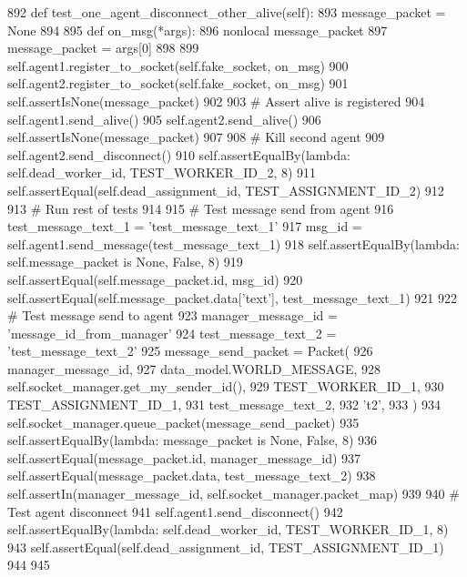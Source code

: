 \begin{DoxyCode}
892     \textcolor{keyword}{def }test\_one\_agent\_disconnect\_other\_alive(self):
893         message\_packet = \textcolor{keywordtype}{None}
894 
895         \textcolor{keyword}{def }on\_msg(*args):
896             nonlocal message\_packet
897             message\_packet = args[0]
898 
899         self.agent1.register\_to\_socket(self.fake\_socket, on\_msg)
900         self.agent2.register\_to\_socket(self.fake\_socket, on\_msg)
901         self.assertIsNone(message\_packet)
902 
903         \textcolor{comment}{# Assert alive is registered}
904         self.agent1.send\_alive()
905         self.agent2.send\_alive()
906         self.assertIsNone(message\_packet)
907 
908         \textcolor{comment}{# Kill second agent}
909         self.agent2.send\_disconnect()
910         self.assertEqualBy(\textcolor{keyword}{lambda}: self.dead\_worker\_id, TEST\_WORKER\_ID\_2, 8)
911         self.assertEqual(self.dead\_assignment\_id, TEST\_ASSIGNMENT\_ID\_2)
912 
913         \textcolor{comment}{# Run rest of tests}
914 
915         \textcolor{comment}{# Test message send from agent}
916         test\_message\_text\_1 = \textcolor{stringliteral}{'test\_message\_text\_1'}
917         msg\_id = self.agent1.send\_message(test\_message\_text\_1)
918         self.assertEqualBy(\textcolor{keyword}{lambda}: self.message\_packet \textcolor{keywordflow}{is} \textcolor{keywordtype}{None}, \textcolor{keyword}{False}, 8)
919         self.assertEqual(self.message\_packet.id, msg\_id)
920         self.assertEqual(self.message\_packet.data[\textcolor{stringliteral}{'text'}], test\_message\_text\_1)
921 
922         \textcolor{comment}{# Test message send to agent}
923         manager\_message\_id = \textcolor{stringliteral}{'message\_id\_from\_manager'}
924         test\_message\_text\_2 = \textcolor{stringliteral}{'test\_message\_text\_2'}
925         message\_send\_packet = Packet(
926             manager\_message\_id,
927             data\_model.WORLD\_MESSAGE,
928             self.socket\_manager.get\_my\_sender\_id(),
929             TEST\_WORKER\_ID\_1,
930             TEST\_ASSIGNMENT\_ID\_1,
931             test\_message\_text\_2,
932             \textcolor{stringliteral}{'t2'},
933         )
934         self.socket\_manager.queue\_packet(message\_send\_packet)
935         self.assertEqualBy(\textcolor{keyword}{lambda}: message\_packet \textcolor{keywordflow}{is} \textcolor{keywordtype}{None}, \textcolor{keyword}{False}, 8)
936         self.assertEqual(message\_packet.id, manager\_message\_id)
937         self.assertEqual(message\_packet.data, test\_message\_text\_2)
938         self.assertIn(manager\_message\_id, self.socket\_manager.packet\_map)
939 
940         \textcolor{comment}{# Test agent disconnect}
941         self.agent1.send\_disconnect()
942         self.assertEqualBy(\textcolor{keyword}{lambda}: self.dead\_worker\_id, TEST\_WORKER\_ID\_1, 8)
943         self.assertEqual(self.dead\_assignment\_id, TEST\_ASSIGNMENT\_ID\_1)
944 
945 
\end{DoxyCode}


